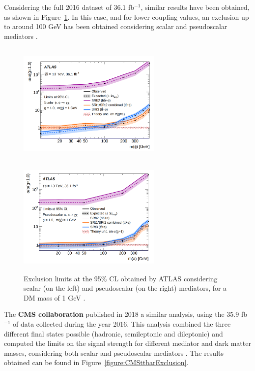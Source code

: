 \documentclass[a4paper, 10pt, openright]{report}
\begin{document}
Considering the full 2016 dataset of $36.1$ fb$^{-1}$, similar results have been obtained, as shown in Figure~\ref{fig:atlas36}. In this case, and for lower coupling values, an exclusion up to around 100 GeV has been obtained considering scalar and pseudoscalar mediators \cite{PreviousDoubleTopBottomAllLep13ATLAS}.

\begin{figure}[htbp]
\centering
\begin{minipage}[b]{.4\textwidth}
\includegraphics[width=7cm, height=6cm]{figs/Atlas36a.png}
\end{minipage}\hfill
\begin{minipage}[b]{.48\textwidth}
\includegraphics[width=7cm, height=5.88cm]{figs/Atlas36b.png}
\end{minipage}\hfill
\caption{Exclusion limits at the 95\% \ac{CL} obtained by \ac{ATLAS} considering  scalar (on the left) and pseudoscalar (on the right) mediators, for a \ac{DM} mass of 1 GeV \cite{PreviousDoubleTopBottomAllLep13ATLAS}.}\label{fig:atlas36}
\end{figure}

The \textbf{\ac{CMS} collaboration} published in 2018 a similar analysis, using the $35.9$ fb$^{-1}$ of data collected during the year 2016. This analysis combined the three different final states possible (hadronic, semileptonic and dileptonic) and computed the limits on the signal strength for different mediator and dark matter masses, considering both scalar and pseudoscalar mediators \cite{PreviousDoubleTopAllLep13CMS}. The results obtained can be found in Figure~\ref{figure:CMSttbarExclusion}. 
\end{document}
